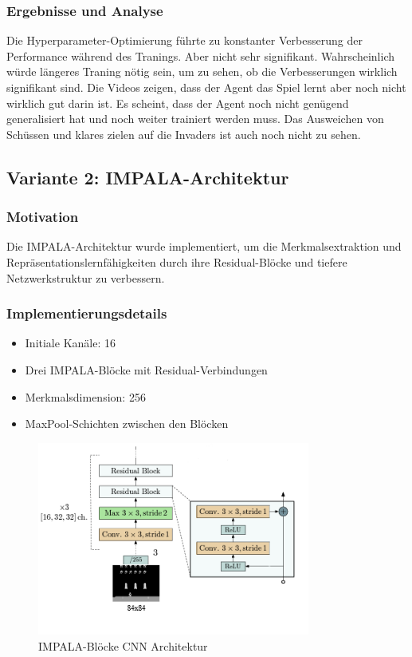 \documentclass{article}
\begin{document}
\subsubsection{Ergebnisse und Analyse}
Die Hyperparameter-Optimierung führte zu konstanter Verbesserung der Performance während des Tranings. Aber nicht sehr signifikant. Wahrscheinlich würde längeres Traning nötig sein, um zu sehen, ob die Verbesserungen wirklich signifikant sind. Die Videos zeigen, dass der Agent das Spiel lernt aber noch nicht wirklich gut darin ist. Es scheint, dass der Agent noch nicht genügend generalisiert hat und noch weiter trainiert werden muss.
Das Ausweichen von Schüssen und klares zielen auf die Invaders ist auch noch nicht zu sehen.
\newpage
\subsection{Variante 2: IMPALA-Architektur}
\subsubsection{Motivation}
Die IMPALA-Architektur wurde implementiert, um die Merkmalsextraktion und Repräsentationslernfähigkeiten durch ihre Residual-Blöcke und tiefere Netzwerkstruktur zu verbessern.

\subsubsection{Implementierungsdetails}
\begin{itemize}
    \item Initiale Kanäle: 16
    \item Drei IMPALA-Blöcke mit Residual-Verbindungen
    \item Merkmalsdimension: 256
    \item MaxPool-Schichten zwischen den Blöcken
\end{itemize}

\begin{figure}[H]
    \centering
    \includegraphics[width=0.8\textwidth]{./Figure_2.png}
    \caption{IMPALA-Blöcke CNN Architektur}
\end{figure}
\end{document}
